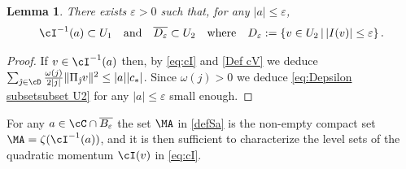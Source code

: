 \documentclass[11pt,a4paper,reqno]{article}
\numberwithin{equation}{section}
\newtheorem{lemma}[theorem]{Lemma}
\theoremstyle{definition}
\begin{document}
\begin{lemma}\label{a nel cono}
    There exists $\varepsilon>0$ such that, for any $ |a| \leq \varepsilon  $, 
\begin{equation}\label{eq:Depsilon subsetsubset U2}
        \cI^{-1}(a) \subset U_1 \quad \text{and} \quad \overline{D_\varepsilon}\subset U_2\quad \text{where} \quad D_\varepsilon:=\{v\in U_2 \, | \, |I(v)|\leq \varepsilon\}\, . 
    \end{equation}
\end{lemma}
\begin{proof}
If $ v \in \cI^{-1}(a) $ then,
by \eqref{eq:cI} and \eqref{Def cV}
we deduce   
$ \sum_{{\hat \jmath}\in \cD} \frac{\omega(j)}{2|j|} 
        \|\Pi_{\hat \jmath} v\|^2 
        \leq |a | |c_* | $. Since $ \omega (j) > 0 $ 
we deduce   \eqref{eq:Depsilon subsetsubset U2}  
for any $ |a| \leq \varepsilon $ small enough.  
\end{proof}
   For any   $a\in \cC\cap \overline{B_\varepsilon}$
    the set $\MA $ in \eqref{defSa} is the non-empty compact set $ \MA = \zeta ( \cI^{-1}(a))  $, and 
    it is then sufficient to characterize  the level sets of the quadratic momentum 
    $ \cI (v) $ in \eqref{eq:cI}. 
\end{document}

